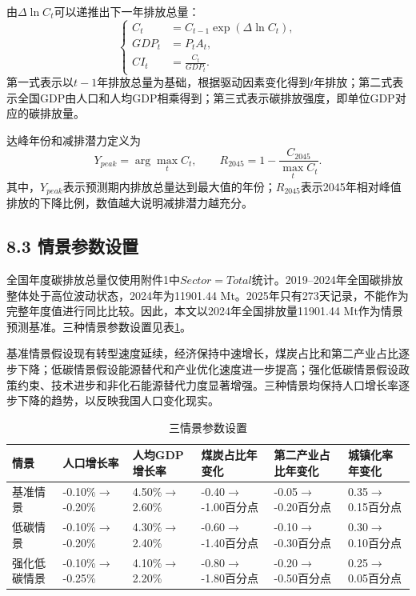 \documentclass[UTF8,zihao=-4,fontset=windows]{ctexart}
\begin{document}
由$\Delta\ln C_t$可以递推出下一年排放总量：
\[
\left\{
\begin{aligned}
C_t&=C_{t-1}\exp(\Delta\ln C_t),\\
GDP_t&=P_tA_t,\\
CI_t&=\frac{C_t}{GDP_t}.
\end{aligned}
\right.
\]
第一式表示以$t-1$年排放总量为基础，根据驱动因素变化得到$t$年排放；第二式表示全国GDP由人口和人均GDP相乘得到；第三式表示碳排放强度，即单位GDP对应的碳排放量。

达峰年份和减排潜力定义为
\[
Y_{peak}=\arg\max_t C_t,\qquad
R_{2045}=1-\frac{C_{2045}}{\max_t C_t}.
\]
其中，$Y_{peak}$表示预测期内排放总量达到最大值的年份；$R_{2045}$表示2045年相对峰值排放的下降比例，数值越大说明减排潜力越充分。

\subsection*{8.3 情景参数设置}

全国年度碳排放总量仅使用附件1中$Sector=Total$统计。2019--2024年全国碳排放整体处于高位波动状态，2024年为11901.44 Mt。2025年只有273天记录，不能作为完整年度值进行同比比较。因此，本文以2024年全国排放量11901.44 Mt作为情景预测基准。三种情景参数设置见表\ref{tab:scenario_params}。

基准情景假设现有转型速度延续，经济保持中速增长，煤炭占比和第二产业占比逐步下降；低碳情景假设能源替代和产业优化速度进一步提高；强化低碳情景假设政策约束、技术进步和非化石能源替代力度显著增强。三种情景均保持人口增长率逐步下降的趋势，以反映我国人口变化现实。

\begin{table}[H]
\centering
\caption{三情景参数设置}
\label{tab:scenario_params}
\scriptsize
\begin{tabularx}{\textwidth}{lXXXXX}
\toprule
情景 & 人口增长率 & 人均GDP增长率 & 煤炭占比年变化 & 第二产业占比年变化 & 城镇化率年变化 \\
\midrule
基准情景 & -0.10\%$\rightarrow$-0.20\% & 4.50\%$\rightarrow$2.60\% & -0.40$\rightarrow$-1.00百分点 & -0.05$\rightarrow$-0.20百分点 & 0.35$\rightarrow$0.15百分点 \\
低碳情景 & -0.10\%$\rightarrow$-0.20\% & 4.30\%$\rightarrow$2.40\% & -0.60$\rightarrow$-1.40百分点 & -0.10$\rightarrow$-0.30百分点 & 0.30$\rightarrow$0.10百分点 \\
强化低碳情景 & -0.10\%$\rightarrow$-0.25\% & 4.10\%$\rightarrow$2.20\% & -0.80$\rightarrow$-1.80百分点 & -0.20$\rightarrow$-0.50百分点 & 0.25$\rightarrow$0.05百分点 \\
\bottomrule
\end{tabularx}
\end{table}
\end{document}
